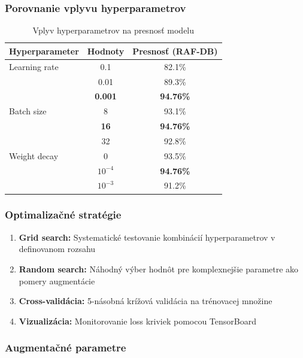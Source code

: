 \subsubsection{Porovnanie vplyvu hyperparametrov}

\begin{table}[H]
\centering
\begin{tabular}{|l|c|c|}
    \hline
    \textbf{Hyperparameter} & \textbf{Hodnoty} & \textbf{Presnosť (RAF-DB)} \\ \hline
    Learning rate & 0.1 & 82.1\% \\ 
    & 0.01 & 89.3\% \\ 
    & \textbf{0.001} & \textbf{94.76\%} \\ \hline
    
    Batch size & 8 & 93.1\% \\ 
    & \textbf{16} & \textbf{94.76\%} \\ 
    & 32 & 92.8\% \\ \hline
    
    Weight decay & $0$ & 93.5\% \\ 
    & $10^{-4}$ & \textbf{94.76\%} \\ 
    & $10^{-3}$ & 91.2\% \\ \hline
\end{tabular}
\caption{Vplyv hyperparametrov na presnosť modelu}
\end{table}

\subsubsection{Optimalizačné stratégie}

\begin{enumerate}
    \item \textbf{Grid search:} Systematické testovanie kombinácií hyperparametrov v definovanom rozsahu
    \item \textbf{Random search:} Náhodný výber hodnôt pre komplexnejšie parametre ako pomery augmentácie
    \item \textbf{Cross-validácia:} 5-násobná krížová validácia na trénovacej množine
    \item \textbf{Vizualizácia:} Monitorovanie loss kriviek pomocou TensorBoard
\end{enumerate}

\subsubsection{Augmentačné parametre}

